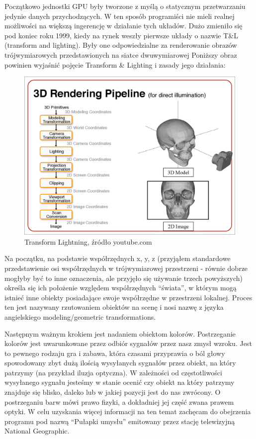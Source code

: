 \documentclass{article}
\begin{document}
	\par
	Początkowo jednostki GPU były tworzone z myślą o statycznym przetwarzaniu jedynie danych przychodzących. W ten sposób programiści nie mieli realnej możliwości na większą ingerencję w działanie tych układów. Dużo zmieniło się pod koniec roku 1999, kiedy na rynek weszły pierwsze układy o nazwie T&L (transform and lighting)\cite{ref13}. Były one odpowiedzialne za renderowanie obrazów trójwymiarowych przedstawionych na siatce dwuwymiarowej Poniższy obraz powinien wyjaśnić pojęcie Transform & Lighting i zasady jego działania:
	\begin{figure}
		\centering
		\includegraphics[width=15cm]{tandl}
		\caption{Transform Lightning, źródło youtube.com}
	\end{figure}
	\par
	Na początku, na podstawie współrzędnych x, y, z (przyjąłem standardowe przedstawienie osi współrzędnych w trójwymiarowej przestrzeni - równie dobrze mogłyby być to inne oznaczenia, ale przyjęło się używanie trzech powyższych) określa się ich położenie względem współrzędnych “świata”, w którym mogą istnieć inne obiekty posiadające swoje współrzędne w przestrzeni lokalnej. Proces ten jest nazywany rzutowaniem obiektów na scenę i nosi nazwę z języka angielskiego modeling/geometric transformations.
	\par
	Następnym ważnym krokiem jest nadaniem obiektom kolorów. Postrzeganie kolorów jest uwarunkowane przez odbiór sygnałów przez nasz zmysł wzroku. Jest to pewnego rodzaju gra i zabawa, która czasami przyprawia o ból głowy spowodowany zbyt dużą ilością wysyłanych sygnałów przez obiekt, na który patrzymy (na przykład iluzja optyczna). W zależności od częstotliwości wysyłanego sygnału jesteśmy w stanie ocenić czy obiekt na który patrzymy znajduje się blisko, daleko lub w jakiej pozycji jest do nas zwrócony. O postrzeganiu barw mówi prawo fizyki, a dokładniej jej część zwana prawem optyki. W celu uzyskania więcej informacji na ten temat zachęcam do obejrzenia programu pod nazwą “Pułapki umysłu” emitowany przez stację telewizyjną National Geographic.
\end{document}
